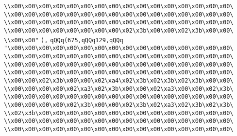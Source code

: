 \verb|\\x00\x00\x00\x00\x00\x00\x00\x00\x00\x00\x00\x00\x00\x00\x00\x00\|\newline
\verb|\\x00\x00\x00\x00\x00\x00\x00\x00\x00\x00\x00\x00\x00\x00\x00\x00\|\newline
\verb|\\x00\x00\x00\x00\x00\x00\x00\x00\x00\x00\x00\x00\x00\x00\x00\x00\|\newline
\verb|\\x00\x00\x00\x00\x00\x00\x00\x00\x02\x3b\x00\x00\x02\x3b\x00\x00\|\newline
\verb|\\x00\x00"|\newline
\verb|),|\newline
\verb|qQQq(675,qQQq129,qQQq|\newline
\verb|"\x00\x00\x00\x00\x00\x00\x00\x00\x00\x00\x00\x00\x00\x00\x00\x00\|\newline
\verb|\\x00\x00\x00\x00\x00\x00\x00\x00\x00\x00\x00\x00\x00\x00\x00\x00\|\newline
\verb|\\x00\x00\x00\x00\x00\x00\x00\x00\x00\x00\x00\x00\x00\x00\x00\x00\|\newline
\verb|\\x00\x00\x00\x00\x00\x00\x00\x00\x00\x00\x00\x00\x00\x00\x00\x00\|\newline
\verb|\\x00\x00\x02\x3b\x00\x00\x02\xa4\x02\x3b\x02\x3b\x02\x3b\x00\x00\|\newline
\verb|\\x00\x00\x00\x00\x02\xa3\x02\x3b\x00\x00\x02\xa3\x00\x00\x02\x3b\|\newline
\verb|\\x00\x00\x00\x00\x00\x00\x00\x00\x00\x00\x00\x00\x00\x00\x00\x00\|\newline
\verb|\\x00\x00\x00\x00\x02\x3b\x00\x00\x02\x3b\x02\xa3\x02\x3b\x02\x3b\|\newline
\verb|\\x02\x3b\x00\x00\x00\x00\x00\x00\x00\x00\x00\x00\x00\x00\x00\x00\|\newline
\verb|\\x00\x00\x00\x00\x00\x00\x00\x00\x00\x00\x00\x00\x00\x00\x00\x00\|\newline
\verb|\\x00\x00\x00\x00\x00\x00\x00\x00\x00\x00\x00\x00\x00\x00\x00\x00\|\newline
